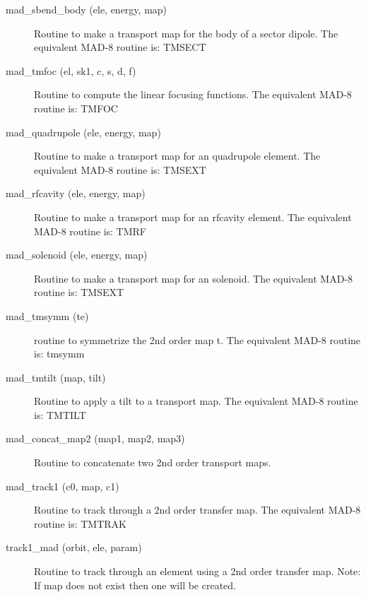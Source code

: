 \begin{description}
\label{r:mad.sbend.body}
\item[mad_sbend_body (ele, energy, map)] \Newline 
     Routine to make a transport map for the body of a sector dipole.
     The equivalent MAD-8 routine is: TMSECT

\label{r:mad.tmfoc}
\item[mad_tmfoc (el, sk1, c, s, d, f)] \Newline 
     Routine to compute the linear focusing functions.  
     The equivalent MAD-8 routine is: TMFOC

\label{r:mad.quadrupole}
\item[mad_quadrupole (ele, energy, map)] \Newline 
     Routine to make a transport map for an quadrupole element.
     The equivalent MAD-8 routine is: TMSEXT

\label{r:mad.rfcavity}
\item[mad_rfcavity (ele, energy, map)] \Newline 
     Routine to make a transport map for an rfcavity element.
     The equivalent MAD-8 routine is: TMRF

\label{r:mad.solenoid}
\item[mad_solenoid (ele, energy, map)] \Newline 
     Routine to make a transport map for an solenoid.
     The equivalent MAD-8 routine is: TMSEXT

\label{r:mad.tmsymm}
\item[mad_tmsymm (te)] \Newline 
     routine to symmetrize the 2nd order map t.
     The equivalent MAD-8 routine is: tmsymm

\label{r:mad.tmtilt}
\item[mad_tmtilt (map, tilt)] \Newline 
     Routine to apply a tilt to a transport map.
     The equivalent MAD-8 routine is: TMTILT

\label{r:mad.concat.map2}
\item[mad_concat_map2 (map1, map2, map3)] \Newline 
     Routine to concatenate two 2nd order transport maps.

\label{r:mad.track1}
\item[mad_track1 (c0, map, c1)] \Newline 
     Routine to track through a 2nd order transfer map.
     The equivalent MAD-8 routine is: TMTRAK

\label{r:track1.mad}
\item[track1_mad (orbit, ele, param)] \Newline 
     Routine to track through an element using a 2nd order transfer map.
     Note: If map does not exist then one will be created. 


\end{description}

